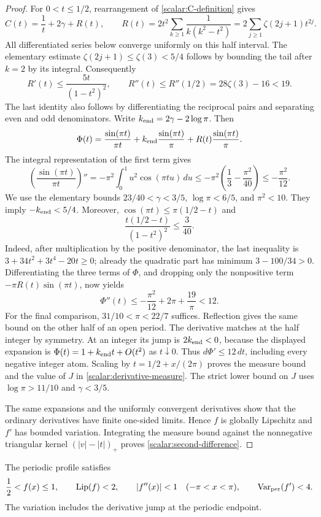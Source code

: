 \begin{proof}
For $0<t\leq1/2$, rearrangement of
\eqref{scalar:C-definition} gives
\[
 C(t)=\frac1t+2\gamma+R(t),\qquad
 R(t)=2t^2\sum_{k\geq1}\frac1{k(k^2-t^2)}
     =2\sum_{j\geq1}\zeta(2j+1)t^{2j}.
\]
All differentiated series below converge uniformly on this half
interval.  The elementary estimate $\zeta(2j+1)\leq\zeta(3)<5/4$
follows by bounding the tail after $k=2$ by its integral.  Consequently
\[
 R'(t)\leq\frac{5t}{(1-t^2)^2},\qquad
 R''(t)\leq R''(1/2)=28\zeta(3)-16<19.
\]
The last identity also follows by differentiating the reciprocal
pairs and separating even and odd denominators.  Write
$k_{\rm end}=2\gamma-2\log\pi$.  Then
\[
 \Phi(t)=\frac{\sin(\pi t)}{\pi t}
       +k_{\rm end}\frac{\sin(\pi t)}\pi
       +R(t)\frac{\sin(\pi t)}\pi.
\]
The integral representation of the first term gives
\[
 \left(\frac{\sin(\pi t)}{\pi t}\right)''
 =-\pi^2\int_0^1u^2\cos(\pi tu)\,du
 \leq-\pi^2\left(\frac13-\frac{\pi^2}{40}\right)
 \leq-\frac{\pi^2}{12}.
\]
We use the elementary bounds
$23/40<\gamma<3/5$, $\log\pi<6/5$, and $\pi^2<10$.
They imply $-k_{\rm end}<5/4$.  Moreover,
$\cos(\pi t)\leq\pi(1/2-t)$ and
\[
 \frac{t(1/2-t)}{(1-t^2)^2}\leq\frac3{40}.
\]
Indeed, after multiplication by the positive denominator, the last
inequality is
$3+34t^2+3t^4-20t\geq0$; already the quadratic part has minimum
$3-100/34>0$.  Differentiating the three terms of $\Phi$, and dropping
only the nonpositive term $-\pi R(t)\sin(\pi t)$, now yields
\[
 \Phi''(t)\leq-\frac{\pi^2}{12}+2\pi+\frac{19}\pi<12.
\]
For the final comparison, $31/10<\pi<22/7$ suffices.
Reflection gives the same bound on the other half of an open period.
The derivative matches at the half integer by symmetry.  At an integer
its jump is $2k_{\rm end}<0$, because the displayed expansion is
$\Phi(t)=1+k_{\rm end}t+O(t^2)$ as $t\downarrow0$.
Thus $d\Phi'\leq12\,dt$, including every negative integer atom.
Scaling by $t=1/2+x/(2\pi)$ proves the measure bound and the value of
$J$ in \eqref{scalar:derivative-measure}.  The strict lower bound on
$J$ uses $\log\pi>11/10$ and $\gamma<3/5$.

The same expansions and the uniformly convergent derivatives show
that the ordinary derivatives have finite one-sided limits.  Hence
$f$ is globally Lipschitz and $f'$ has bounded variation.  Integrating
the measure bound against the nonnegative triangular kernel
$(|v|-|t|)_+$ proves \eqref{scalar:second-difference}.
\end{proof}

\begin{lemma}
\label{scalar:global-profile-bounds}
The periodic profile satisfies
\begin{equation}\label{scalar:profile-bounds}
 \frac12<f(x)\leq1,\qquad \operatorname{Lip}(f)<2,\qquad
 |f''(x)|<1\quad(-\pi<x<\pi),\qquad
 \operatorname{Var}_{\rm per}(f')<4.
\end{equation}
The variation includes the derivative jump at the periodic endpoint.
\end{lemma}


